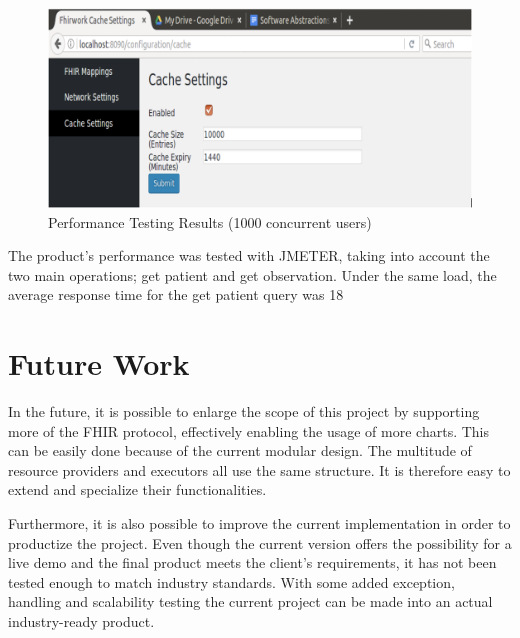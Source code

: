 \documentclass[sigconf]{acmart}
\begin{document}
\begin{figure}[!!h] 
	\centering 
	\includegraphics[width=0.8\columnwidth]{caching.png}
	\caption{Performance Testing Results (1000 concurrent users)} 
	\label{fig:performance}
\end{figure}

The product’s performance was tested with JMETER, taking into account the two main operations; get patient and get observation. Under the same load, the average response time for the get patient query was 18%

\section{Future Work} 

In the future, it is possible to enlarge the scope of this project by supporting more of the FHIR protocol, effectively enabling the usage of more charts. This can be easily done because of the current modular design. The multitude of resource providers and executors all use the same structure. It is therefore easy to extend and specialize their functionalities.

Furthermore, it is also possible to improve the current implementation in order to productize the project. Even though the current version offers the possibility for a live demo and the final product meets the client’s requirements, it has not been tested enough to match industry standards. With some added exception, handling and scalability testing the current project can be made into an actual industry-ready product.
\end{document}
